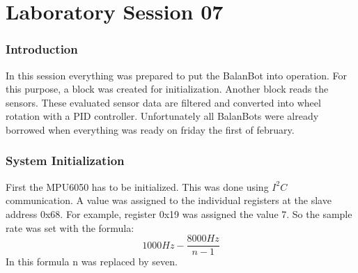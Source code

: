 \clearpage
\part{Laboratory Session 07}
\section{Introduction}
In this session everything was prepared to put the BalanBot into operation. For this purpose, a block was created for initialization. Another block reads the sensors. These evaluated sensor data are filtered and converted into wheel rotation with a PID controller.
Unfortunately all BalanBots were already borrowed when everything was ready on friday the first of february.

\section{System Initialization}
First the MPU6050 has to be initialized. This was done using $I^2C$ communication.
A value was assigned to the individual registers at the slave address 0x68.
For example, register 0x19 was assigned the value 7. So the sample rate was set with the formula:\\
	\begin{equation}
		1000Hz - \frac{8000Hz}{n-1}
	\end{equation}
In this formula n was replaced by seven.	\\

